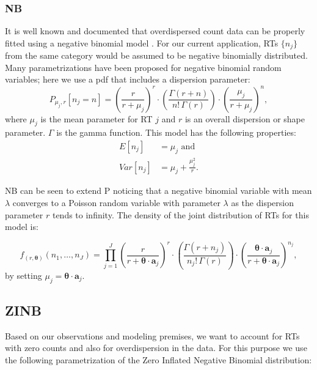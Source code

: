 \documentclass[11pt]{article}
\begin{document}
\subsubsection{NB}
\label{nb}
It is well known and documented that overdispersed count data can be properly fitted using a negative binomial model \cite{anders2010differential}. For our current application, RTs $\{n_j\}$ from the same category would be assumed to be negative binomially distributed. Many parametrizations have been proposed for negative binomial random variables; here we use a pdf that includes a dispersion parameter: 
\[P_{\mu_j,r}[n_j=n]=\left(\frac{r}{r+\mu_j}\right)^r\cdot \left(\frac{\Gamma(r+n)}{n!\,\Gamma(r)}\right)\cdot \left(\frac{\mu_j}{r+\mu_j}\right)^{n},\]
\noindent where $\mu_j$ is the mean parameter for RT $j$ and $r$ is an overall dispersion or shape parameter. $\Gamma$ is the gamma function. This model has the following properties:
\begin{equation} 
    \begin{split} 
      E[n_j]&=\mu_j \text{ and }\\
      Var[n_j]&=\mu_j+\frac{\mu_j^2}{r}.
\label{NB_moms}
    \end{split}
\end{equation}  

NB can be seen to extend P noticing that a negative binomial variable with mean $\lambda$ converges to a Poisson random variable with parameter $\lambda$ as the dispersion parameter $r$ tends to infinity.
The density of the joint distribution of RTs for this model is:
  
\begin{equation}
\label{NB_den}
f_{(r,\boldsymbol{\theta})}(n_1,\ldots,n_J)= \prod_{j=1}^J  \left(\frac{r}{r+\boldsymbol{\theta}\cdot\mathbf{a}_j}\right)^r\cdot \left(\frac{\Gamma(r+n_j)}{n_j!\,\Gamma(r)}\right)\cdot \left(\frac{\boldsymbol{\theta}\cdot\mathbf{a}_j}{r+\boldsymbol{\theta}\cdot\mathbf{a}_j}\right)^{n_j},
\end{equation}
\noindent by setting $\mu_j=\boldsymbol{\theta}\cdot \mathbf{a}_j$.
  
\subsection{ZINB}
\label{zinb}

Based on our observations and modeling premises, we want to account for RTs with zero counts and also for overdispersion in the data. For this purpose we use the following parametrization of the Zero Inflated Negative Binomial distribution:
\end{document}
